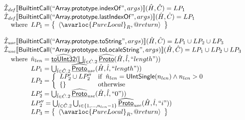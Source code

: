 \[\begin{array}{l}
\aI_{\it def}\lbr \SF{BuiltintCall}(``\SF{Array.prototype.indexOf}",args)\rbr(\hat{H},\hat{C}) = LP_1\\
\aI_{\it def}\lbr \SF{BuiltintCall}(``\SF{Array.prototype.lastIndexOf}",args)\rbr(\hat{H},\hat{C}) =LP_1\\
\quad\wherec{
  LP_1 = \set{\langle\avarloc{PureLocal}_R,\varprop{return}\rangle}\\
  }\\
\\

\aI_{\it use}\lbr \SF{BuiltintCall}(``\SF{Array.prototype.toString}",args)\rbr(\hat{H},\hat{C}) = LP_1 \cup LP_2 \cup LP_3\\
\aI_{\it use}\lbr \SF{BuiltintCall}(``\SF{Array.prototype.toLocaleString}",args)\rbr(\hat{H},\hat{C}) =LP_1 \cup LP_2 \cup LP_3\\
\quad\wherec{
  \hat{n}_{len} = \ahf{toUInt32}(\bigsqcup_{\hat{l} \in \hat{C}.2}  \ahf{Proto}(\hat{H}, \hat{l}, ``length"))\\
  LP_1 = \bigcup_{\hat{l} \in \hat{C}.2} \ahf{Proto}_{\it use}(\hat{H}, \hat{l}, ``length"))\\
  LP_2 = \left\{\begin{array}{ll}
      LP_2' \cup LP_2'' & \ifc{\hat{n}_{len} = \SF{UIntSingle}(n_{len}) \land n_{len} > 0}\\
      \set{} & \owc
    \end{array}\right.\\
  LP_2' = \bigcup_{\hat{l} \in \hat{C}.2} \ahf{Proto}_{\it use}(\hat{H}, \hat{l}, ``0"))\\
  LP_2'' = \bigcup_{\hat{l} \in \hat{C}.2} \bigcup_{i \in \{1,...,n_{len}-1\}}\ahf{Proto}_{\it use}(\hat{H}, \hat{l}, ``i"))\\
  LP_3 = \set{\langle\avarloc{PureLocal}_R,\varprop{return}\rangle}\\
  }\\
\\




\end{array}\]

